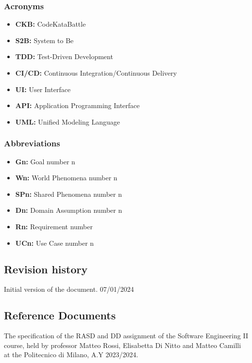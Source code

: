 \documentclass{article}
\begin{document}
\subsubsection{Acronyms}

\begin{itemize}
    \item \textbf{CKB:} CodeKataBattle
    \item \textbf{S2B:} System to Be
    \item \textbf{TDD:} Test-Driven Development
    \item \textbf{CI/CD:} Continuous Integration/Continuous Delivery
    \item \textbf{UI:} User Interface
    \item \textbf{API:} Application Programming Interface
    \item \textbf{UML:} Unified Modeling Language
\end{itemize}

\subsubsection{Abbreviations}

\begin{itemize}
    \item \textbf{Gn:} Goal number n
    \item \textbf{Wn:} World Phenomena number n
    \item \textbf{SPn:} Shared Phenomena number n
    \item \textbf{Dn:} Domain Assumption number n
    \item \textbf{Rn:} Requirement number 
    \item \textbf{UCn:} Use Case number n
\end{itemize}

\subsection{Revision history}

Initial version of the document. 07/01/2024

\subsection{Reference Documents}

The specification of the RASD and DD assignment of the Software
Engineering II course, held by professor Matteo Rossi, Elisabetta Di Nitto and
Matteo Camilli at the Politecnico di Milano, A.Y 2023/2024.
\end{document}
